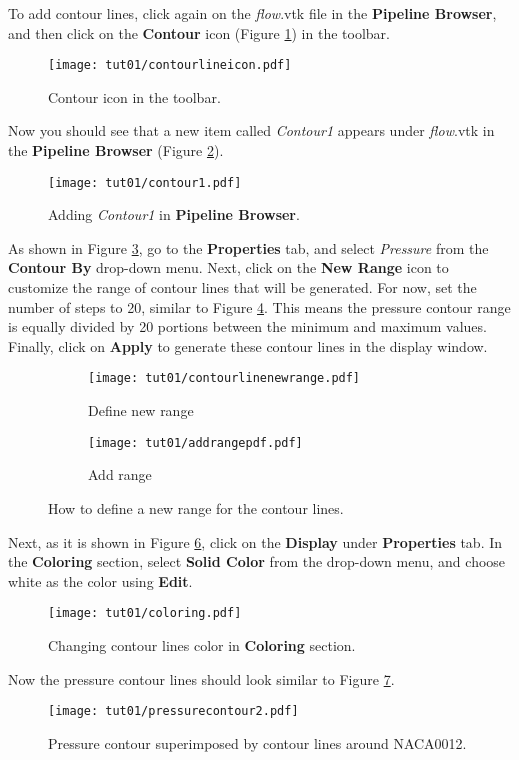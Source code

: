 To add contour lines, click again on the \textit{flow}.vtk file in the \textbf{Pipeline Browser}, and then click on the \textbf{Contour} icon (Figure \ref{fig1:contour_icon}) in the toolbar.
\begin{figure}[htbp]
    \centering
    \texttt{[image: tut01/contourlineicon.pdf]}
    \caption{Contour icon in the toolbar.}
    \label{fig1:contour_icon}
\end{figure}
Now you should see that a new item called \textit{Contour1} appears under \textit{flow}.vtk in the \textbf{Pipeline Browser} (Figure \ref{fig1:contour1}).
\begin{figure}[htbp]
    \centering
    \texttt{[image: tut01/contour1.pdf]}
    \caption{Adding \textit{Contour1} in \textbf{Pipeline Browser}.}
    \label{fig1:contour1}
\end{figure}
As shown in Figure \ref{fig1:contourby a}, go to the \textbf{Properties} tab, and select \textit{Pressure} from the \textbf{Contour By} drop-down menu. Next, click on the \textbf{New Range} icon to customize the range of contour lines that will be generated. For now, set the number of steps to 20, similar to Figure \ref{fig1:contourby b}. This means the pressure contour range is equally divided by 20 portions between the minimum and maximum values. Finally, click on \textbf{Apply} to generate these contour lines in the display window.
\begin{figure}[htbp]
    \centering
     \begin{subfigure}[b]{.4\textwidth}
         \centering
         \texttt{[image: tut01/contourlinenewrange.pdf]}
         \caption{Define new range}
         \label{fig1:contourby a}
     \end{subfigure}
     \hfill
     \begin{subfigure}[b]{.4\textwidth}
         \centering
         \texttt{[image: tut01/addrangepdf.pdf]}
         \caption{Add range}
         \label{fig1:contourby b}
     \end{subfigure}     
    \caption{How to define a new range for the contour lines.}
    \label{fig1:contourby}
\end{figure}
Next, as it is shown in Figure \ref{fig1:colorby2}, click on the \textbf{Display} under \textbf{Properties} tab. In the \textbf{Coloring} section, select \textbf{Solid Color} from the drop-down menu, and choose white as the color using \textbf{Edit}.
\begin{figure}[htbp]
    \centering
    \texttt{[image: tut01/coloring.pdf]}
    \caption{Changing contour lines color in \textbf{Coloring} section.}
    \label{fig1:colorby2}
\end{figure}
Now the pressure contour lines should look similar to Figure \ref{fig1:pressure_contour_lines}.
\begin{figure}[htbp]
    \centering
    \texttt{[image: tut01/pressurecontour2.pdf]}
    \caption{Pressure contour superimposed by contour lines around NACA0012.}
    \label{fig1:pressure_contour_lines}
\end{figure}
